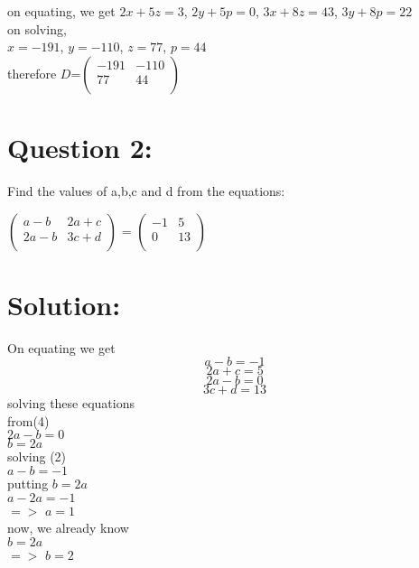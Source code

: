 \documentclass{article}
\begin{document}
on equating, we get
$2x+5z=3$, $2y+5p=0$, $3x+8z=43$, $3y+8p=22$\\

on solving,\\
$x=-191$, $y=-110$, $z=77$, $p=44$\\
therefore $D$=$\begin{pmatrix}
    -191 & -110\\
    77 & 44\\
\end{pmatrix}$\\

\newpage

\section*{Question 2:}

Find the values of a,b,c and d from the equations:

$\begin{pmatrix}
    a-b & 2a + c\\
    2a-b & 3c + d\\
\end{pmatrix}$ = $\begin{pmatrix}
   -1 & 5 \\
    0 & 13\\
\end{pmatrix}$\\

\section*{Solution:}
On equating we get\\
\begin{equation}
    a-b=-1
\end{equation}
\begin{equation}
    2a+c=5
\end{equation}
\begin{equation}
    2a-b=0
\end{equation}
\begin{equation}
    3c+d=13
\end{equation}
solving these equations\\
from(4)\\
$2a-b=0$\\
$b=2a$\\
solving (2)\\
$a-b=-1$\\
putting $b=2a$\\
$a-2a=-1$\\
$=>$\hspace{2cm} $a=1$\\
now, we already know\\
$b=2a$\\
$=>$\hspace{2cm}  $b=2$\\
\end{document}
